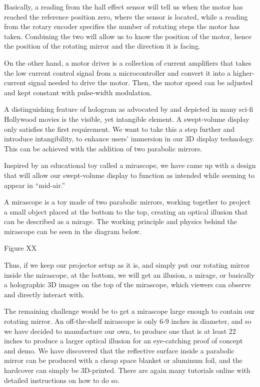 \documentclass[12pt]{article}
\begin{document}
Basically, a reading from the hall effect sensor will tell us when the motor has reached the reference position zero, where the sensor is located, while a reading from the rotary encoder specifies the number of rotating steps the motor has taken. Combining the two will allow us to know the position of the motor, hence the position of the rotating mirror and the direction it is facing.

On the other hand, a motor driver is a collection of current amplifiers that takes the low current control signal from a microcontroller and convert it into a higher-current signal needed to drive the motor. Then, the motor speed can be adjusted and kept constant with pulse-width modulation.

A distinguishing feature of hologram as advocated by and depicted in many sci-fi Hollywood movies is the visible, yet intangible element. A swept-volume display only satisfies the first requirement. We want to take this a step further and introduce intangibility, to enhance users’ immersion in our 3D display technology. This can be achieved with the addition of two parabolic mirrors.

Inspired by an educational toy called a mirascope, we have came up with a design that will allow our swept-volume display to function as intended while seeming to appear in “mid-air.”

A mirascope is a toy made of two parabolic mirrors, working together to project a small object placed at the bottom to the top, creating an optical illusion that can be described as a mirage. The working principle and physics behind the mirascope can be seen in the diagram below.

Figure XX

Thus, if we keep our projector setup as it is, and simply put our rotating mirror inside the mirascope, at the bottom, we will get an illusion, a mirage, or basically a holographic 3D images on the top of the mirascope, which viewers can observe and directly interact with. 

The remaining challenge would be to get a mirascope large enough to contain our rotating mirror. An off-the-shelf mirascope is only 6-9 inches in diameter, and so we have decided to manufacture our own, to produce one that is at least 22 inches to produce a larger optical illusion for an eye-catching proof of concept and demo.
We have discovered that the reflective surface inside a parabolic mirror can be produced with a cheap space blanket or aluminum foil, and the hardcover can simply be 3D-printed. There are again many tutorials online with detailed instructions on how to do so. 
\end{document}
